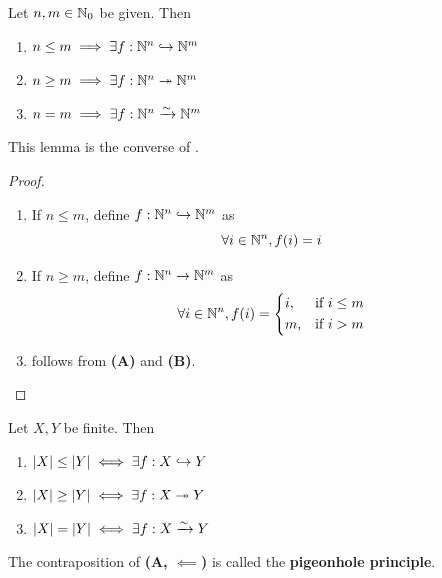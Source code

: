 \bigskip

\begin{lemma} \label{an:lem:properties-of-Nm-Nn-converse}
    Let $n, m \in \N_{0}$ be given. Then
    \begin{enumerate}[label=\textbf{(\Alph*)}]
        \item $n \leq m \implies \exists f: \N^{n} \hookrightarrow \N^{m}$
        \item $n \geq m \implies \exists f: \N^{n} \twoheadrightarrow \N^{m}$
        \item $n = m \implies \exists f: \N^{n} \xrightarrow{\sim} \N^{m}$
    \end{enumerate}
    This lemma is the converse of .
\end{lemma}

\begin{proof}
    \begin{enumerate}[label=\textbf{(\Alph*)}]
        \item If $n \leq m$, define $f: \N^{n} \hookrightarrow \N^{m}$ as
        \[
        \forall i \in \N^{n}, f(i) = i
        \]
        \item If $n \geq m$, define $f: \N^{n} \to \N^{m}$ as
        \[
        \forall i \in \N^{n}, f(i) = \begin{dcases}
            i, & \text{if } i \leq m \\
            m, & \text{if } i > m
        \end{dcases}
        \]
        \item follows from \textbf{(A)} and \textbf{(B)}.
    \end{enumerate}
\end{proof}

\bigskip

\begin{theorem} \label{an:thm:properties-of-cardinality}
    Let $X, Y$ be finite. Then
    \begin{enumerate}[label=\textbf{(\Alph*)}]
        \item $\abs*{X} \leq \abs*{Y} \iff \exists f: X \hookrightarrow Y$
        \item $\abs*{X} \geq \abs*{Y} \iff \exists f: X \twoheadrightarrow Y$
        \item $\abs*{X} = \abs*{Y} \iff \exists f: X \xrightarrow{\sim} Y$
    \end{enumerate}
    The contraposition of \textbf{(A, $\impliedby$)} is called the \textbf{pigeonhole principle}.
\end{theorem}

